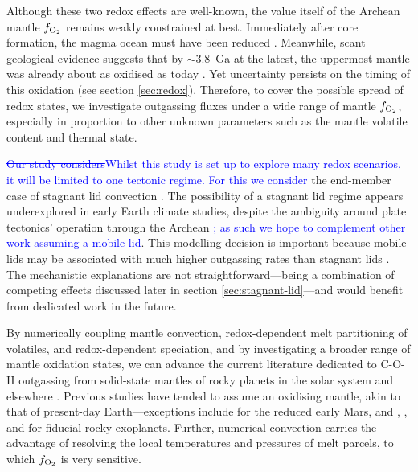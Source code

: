 \documentclass[3p,authoryear]{elsarticle}
\newcommand{\editthree}[2]{\textcolor{blue}{\sout{#1}#2}}
\begin{document}
Although these two redox effects are well-known, the value itself of the Archean mantle $f_{\rm O_2}$ remains weakly constrained at best. Immediately after core formation, the magma ocean must have been reduced \citep{Wood2006}. Meanwhile, scant geological evidence suggests that by $\sim$3.8~Ga at the latest, the uppermost mantle was already about as oxidised as today \citep{Canil1997, Delano2001, Trail2011, NICKLAS2019, Armstrong2019}. Yet uncertainty persists on the timing of this oxidation (see section \ref{sec:redox}). Therefore, to cover the possible spread of redox states, we investigate outgassing fluxes under a wide range of mantle $f_{\rm O_2}$, especially in proportion to other unknown parameters such as the mantle volatile content and thermal state.

\editthree{Our study considers}{Whilst this study is set up to explore many redox scenarios, it will be limited to one tectonic regime. For this we consider} the end-member case of stagnant lid convection \citep{Debaille2013}. The possibility of a stagnant lid regime appears underexplored in early Earth climate studies, despite the ambiguity around plate tectonics' operation through the Archean \citep[e.g.,][]{Brown2020}\editthree{}{; as such we hope to complement other work assuming a mobile lid}. This modelling decision is important because mobile lids may be associated with much higher outgassing rates than stagnant lids \citep{noack2014can, Noack2017}. The mechanistic explanations are not straightforward---being a combination of competing effects discussed later in section \ref{sec:stagnant-lid}---and would benefit from dedicated work in the future.

By numerically coupling mantle convection, redox-dependent melt partitioning of volatiles, and redox-dependent speciation, and by investigating a broader range of mantle oxidation states, we can advance the current literature dedicated to C-O-H outgassing from solid-state mantles of rocky planets in the solar system and elsewhere \citep{ONeill2007,Grott2011,noack2014can,Noack2017,tosi2017habitability,dorn2018outgassing, Ortenzi2020}. Previous studies have tended to assume an oxidising mantle, akin to that of present-day Earth---exceptions include \citet{Grott2011} for the reduced early Mars, and \citet{tosi2017habitability}, \citet{Ortenzi2020}, and \citet{Liggins2020} for fiducial rocky exoplanets. %
Further, numerical convection carries the advantage of resolving the local temperatures and pressures of melt parcels, to which $f_{\rm O_2}$ is very sensitive. 
\end{document}
